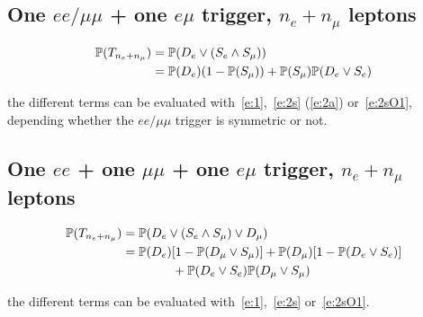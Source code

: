 \documentclass{article}
\newcommand{\pro}{\ensuremath{\mathbb{P}}}
\begin{document}
\subsection{One $ee/\mu\mu$ + one $e\mu$ trigger, $n_e+n_\mu$ leptons}

\begin{align}
\pro(T_{n_e+n_\mu}) &= \pro(D_e \vee (S_e\wedge S_\mu))\notag\\
&= \pro(D_e)(1-\pro(S_\mu)) + \pro(S_\mu)\pro(D_e\vee S_e) 
\end{align}

the different terms can be evaluated with~\ref{e:1},~\ref{e:2s} (\ref{e:2a}) or~\ref{e:2sO1}, 
depending whether the $ee/\mu\mu$ trigger is symmetric or not. 

\subsection{One $ee$ + one $\mu\mu$ + one $e\mu$ trigger, $n_e+n_\mu$ leptons}

\begin{align}
\pro(T_{n_e+n_\mu}) &= \pro(D_e \vee (S_e\wedge S_\mu) \vee D_\mu)\notag\\
&= \pro(D_e)[1-\pro(D_\mu\vee S_\mu)] + \pro(D_\mu)[1-\pro(D_e\vee S_e)]\notag\\
&\qquad\qquad +  \pro(D_e\vee S_e) \pro(D_\mu\vee S_\mu) 
\end{align}

the different terms can be evaluated with~\ref{e:1},~\ref{e:2s} or~\ref{e:2sO1}. 


%
\end{document}
